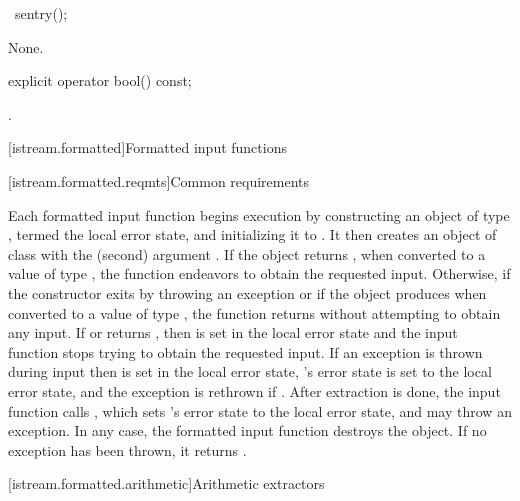 %
%
\begin{itemdecl}
~sentry();
\end{itemdecl}

\begin{itemdescr}
\pnum
\effects
None.
\end{itemdescr}

%
\begin{itemdecl}
explicit operator bool() const;
\end{itemdecl}

\begin{itemdescr}
\pnum
\returns
{}.
\end{itemdescr}

[istream.formatted]{Formatted input functions}

[istream.formatted.reqmts]{Common requirements}

\pnum
Each formatted input function begins execution by constructing
an object of type , termed the local error state, and
initializing it to .
It then creates an object of class
with the
(second) argument
.
If the
object returns
,
when converted to a value of type
,
the function endeavors
to obtain the requested input.
Otherwise,
if the  constructor exits by throwing an exception or
if the  object produces 
when converted to a value of type ,
the function returns without attempting to obtain any input.
If  or 
returns , then
 is set in the local error state and
the input function stops trying to obtain the requested input.
If an exception is thrown during input then
 is set in the local error state,
's error state is set to the local error state, and
the exception is rethrown if .
After extraction is done, the input function calls , which
sets 's error state to the local error state, and
may throw an exception.
In any case, the formatted input function destroys the
object.
If no exception has been thrown, it returns
.

[istream.formatted.arithmetic]{Arithmetic extractors}

